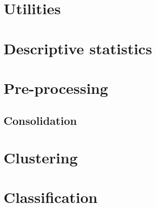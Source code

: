 \documentclass[../thesis.tex]{subfiles}
\begin{document}


\section{Utilities}
\label{sec:utilities}



\section{Descriptive statistics}
\label{sec:app_desc_stat}



\section{Pre-processing}
\label{sec:pre_proc}



\subsection{Consolidation}
\label{sec:consolidation}



\section{Clustering}
\label{sec:clust}



\section{Classification}
\label{sec:classifi}


\end{document}
